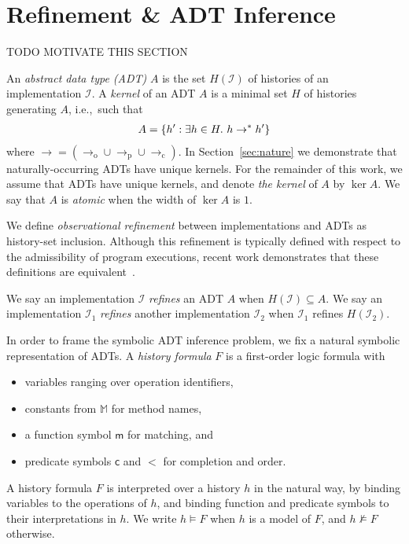 \section{Refinement \& ADT Inference}
\label{sec:inference}

TODO MOTIVATE THIS SECTION

An \emph{abstract data type (ADT)} $A$ is the set $H(\mathcal{I})$ of histories
of an implementation $\mathcal{I}$. A \emph{kernel} of an ADT $A$ is a minimal
set $H$ of histories generating $A$, i.e.,~such that
\begin{align*}
  A = {\{{ h' : \exists h \in H.\ h \to^\ast h' }\}}
\end{align*}
where $\to = (\to_\mathrm{o} \cup \to_\mathrm{p} \cup \to_\mathrm{c})$. In
Section~\ref{sec:nature} we demonstrate that naturally-occurring ADTs have
unique kernels. For the remainder of this work, we assume that ADTs have unique
kernels, and denote \emph{the kernel} of $A$ by $\ker A$. We say that $A$ is
\emph{atomic} when the width of $\ker A$ is $1$.

We define \emph{observational refinement} between implementations and ADTs as
history-set inclusion. Although this refinement is typically defined with
respect to the admissibility of program executions, recent work demonstrates
that these definitions are equivalent~\cite{conf/popl/BouajjaniEEH15}.

\begin{definition}

  We say an implementation $\mathcal{I}$ \emph{refines} an ADT $A$ when
  $H(\mathcal{I}) \subseteq A$. We say an implementation $\mathcal{I}_1$
  \emph{refines} another implementation $\mathcal{I}_2$ when $\mathcal{I}_1$
  refines $H(\mathcal{I}_2)$.

\end{definition}

In order to frame the symbolic ADT inference problem, we fix a natural symbolic
representation of ADTs. A \emph{history formula} $F$ is a first-order logic
formula with
\begin{itemize}

  \item variables ranging over operation identifiers,

  \item constants from $\mathbb{M}$ for method names,

  \item a function symbol $\mathsf{m}$ for matching, and

  \item predicate symbols $\mathsf{c}$ and $\mathsf{<}$ for completion and
  order.

\end{itemize}
A history formula $F$ is interpreted over a history $h$ in the natural way, by
binding variables to the operations of $h$, and binding function and predicate
symbols to their interpretations in $h$. We write $h \models F$ when $h$ is a
model of $F$, and $h \not\models F$ otherwise.

